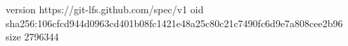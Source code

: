 version https://git-lfs.github.com/spec/v1
oid sha256:106cfcd944d0963cd401b08fc1421e48a25c80c21c7490fc6d9e7a808cee2b96
size 2796344
